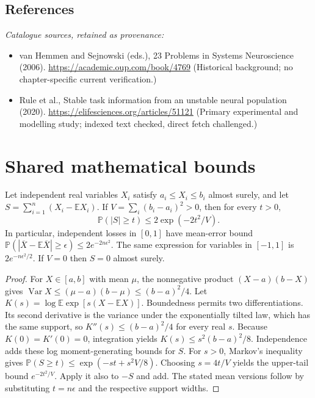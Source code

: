 \documentclass[11pt]{article}
\begin{document}
\subsection{References}
\noindent\emph{Catalogue sources, retained as provenance:}
\begin{itemize}
\item van Hemmen and Sejnowski (eds.), 23 Problems in Systems Neuroscience (2006). \url{https://academic.oup.com/book/4769} (Historical background; no chapter-specific current verification.)
\item Rule et al., Stable task information from an unstable neural population (2020). \url{https://elifesciences.org/articles/51121} (Primary experimental and modelling study; indexed text checked, direct fetch challenged.)
\end{itemize}




\section{Shared mathematical bounds}\label{app:bounds}
\begin{lemma}\label{lem:bounded}
Let independent real variables $X_i$ satisfy $a_i\leq X_i\leq b_i$ almost surely,
and let $S=\sum_{i=1}^n(X_i-\mathbb{E} X_i)$. If
$V=\sum_i(b_i-a_i)^2>0$, then for every $t>0$,
\[
 \mathbb{P}(|S|\geq t)\leq 2\exp(-2t^2/V).
\]
In particular, independent losses in $[0,1]$ have mean-error bound
$\mathbb{P}(|\overline X-\mathbb{E}\overline X|\geq\epsilon)
\leq2e^{-2n\epsilon^2}$. The same expression for variables in $[-1,1]$
is $2e^{-n\epsilon^2/2}$. If $V=0$ then $S=0$ almost surely.
\end{lemma}
\begin{proof}
For $X\in[a,b]$ with mean $\mu$, the nonnegative product
$(X-a)(b-X)$ gives
$\operatorname{Var} X\leq(\mu-a)(b-\mu)\leq(b-a)^2/4$.
Let $K(s)=\log\mathbb{E}\exp[s(X-\mathbb{E} X)]$.
Boundedness permits two differentiations. Its second derivative is the variance
under the exponentially tilted law, which has the same support, so
$K''(s)\leq(b-a)^2/4$ for every real $s$.
Because $K(0)=K'(0)=0$, integration yields
$K(s)\leq s^2(b-a)^2/8$.
Independence adds these log moment-generating bounds for $S$.
For $s>0$, Markov's inequality gives
$\mathbb{P}(S\geq t)\leq\exp(-st+s^2V/8)$.
Choosing $s=4t/V$ yields the upper-tail bound $e^{-2t^2/V}$.
Apply it also to $-S$ and add. The stated mean versions follow by substituting
$t=n\epsilon$ and the respective support widths.
\end{proof}
\end{document}
